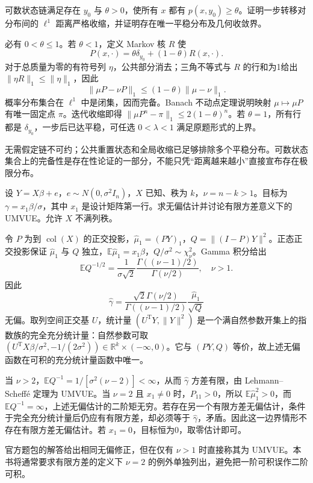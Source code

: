\documentclass[UTF8,12pt,a4paper,fontset=fandol]{ctexbook}
\newcommand{\E}{\mathbb E}
\begin{document}
\begin{example}[原题4：共同重置状态产生的收缩]\label{yau:2022-4}
可数状态链满足存在 $y_0$ 与 $\theta>0$，使所有 $x$ 都有 $p(x,y_0)\ge\theta$。证明一步转移对分布间的 $\ell^1$ 距离严格收缩，并证明存在唯一平稳分布及几何收敛界。
\end{example}
\begin{solve}
必有 $0<\theta\le1$。若 $\theta<1$，定义 Markov 核 $R$ 使
\[
P(x,\cdot)=\theta\delta_{y_0}+(1-\theta)R(x,\cdot).
\]
对于总质量为零的有符号列 $\eta$，公共部分消去；三角不等式与 $R$ 的行和为1给出 $\|\eta R\|_1\le\|\eta\|_1$，因此
\[
\|\mu P-\nu P\|_1\le(1-\theta)\|\mu-\nu\|_1.
\]
概率分布集合在 $\ell^1$ 中是闭集，因而完备。Banach 不动点定理说明映射 $\mu\mapsto\mu P$ 有唯一固定点 $\pi$。迭代收缩即得 $\|\mu P^n-\pi\|_1\le2(1-\theta)^n$。若 $\theta=1$，所有行都是 $\delta_{y_0}$，一步后已达平稳，可任选 $0<\lambda<1$ 满足原题形式的上界。

无需假定链不可约；公共重置状态和全局收缩已足够排除多个平稳分布。可数状态集合上的完备性是存在性论证的一部分，不能只凭“距离越来越小”直接宣布存在极限分布。
\end{solve}

\begin{example}[原题5：正态线性模型中的标准化均值]\label{yau:2022-5}
设 $Y=X\beta+e$，$e\sim N(0,\sigma^2I_n)$，$X$ 已知、秩为 $k$，$\nu=n-k>1$。目标为 $\gamma=x_1\beta/\sigma$，其中 $x_1$ 是设计矩阵第一行。求无偏估计并讨论有限方差意义下的 UMVUE。允许 $X$ 不满列秩。
\end{example}
\begin{solve}
令 $P$ 为到 $\operatorname{col}(X)$ 的正交投影，$\widehat\mu_1=(PY)_1$，$Q=\|(I-P)Y\|^2$。正态正交投影保证 $\widehat\mu_1$ 与 $Q$ 独立，$\E\widehat\mu_1=x_1\beta$，$Q/\sigma^2\sim\chi^2_\nu$。Gamma 积分给出
\[
\E Q^{-1/2}=\frac1{\sigma\sqrt2}\frac{\Gamma((\nu-1)/2)}{\Gamma(\nu/2)},\quad \nu>1.
\]
因此
\[
\widehat\gamma=\frac{\sqrt2\Gamma(\nu/2)}{\Gamma((\nu-1)/2)}\frac{\widehat\mu_1}{\sqrt Q}
\]
无偏。取列空间正交基 $U$，统计量 $(U^{\mathrm T}Y,\|Y\|^2)$ 是一个满自然参数开集上的指数族的完全充分统计量：自然参数可取 $(U^{\mathrm T}X\beta/\sigma^2,-1/(2\sigma^2))\in\mathbb R^k\times(-\infty,0)$。它与 $(PY,Q)$ 等价，故上述无偏函数在可积的充分统计量函数中唯一。

当 $\nu>2$，$\E Q^{-1}=1/[\sigma^2(\nu-2)]<\infty$，从而 $\widehat\gamma$ 方差有限，由 Lehmann--Scheffé 定理为 UMVUE。当 $\nu=2$ 且 $x_1\ne0$ 时，$P_{11}>0$，所以 $\E\widehat\mu_1^2>0$，而 $\E Q^{-1}=\infty$，上述无偏估计的二阶矩无穷。若存在另一个有限方差无偏估计，条件于完全充分统计量后仍应有有限方差，却必须等于 $\widehat\gamma$，矛盾。因此这一边界情形不存在有限方差无偏估计。若 $x_1=0$，目标恒为0，取零估计即可。

官方题包的解答给出相同无偏修正，但在仅有 $\nu>1$ 时直接称其为 UMVUE。本书将通常要求有限方差的定义下 $\nu=2$ 的例外单独列出，避免把一阶可积误作二阶可积。
\end{solve}
\end{document}
